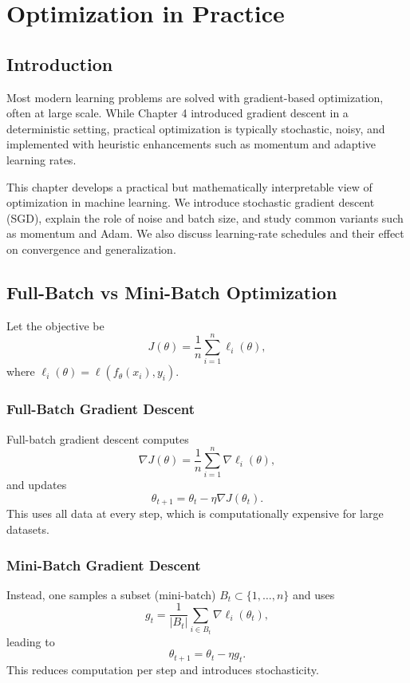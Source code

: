 \chapter{Optimization in Practice}

\section{Introduction}

Most modern learning problems are solved with gradient-based optimization, often at large scale. While Chapter 4 introduced gradient descent in a deterministic setting, practical optimization is typically stochastic, noisy, and implemented with heuristic enhancements such as momentum and adaptive learning rates.

This chapter develops a practical but mathematically interpretable view of optimization in machine learning. We introduce stochastic gradient descent (SGD), explain the role of noise and batch size, and study common variants such as momentum and Adam. We also discuss learning-rate schedules and their effect on convergence and generalization.

\section{Full-Batch vs Mini-Batch Optimization}

Let the objective be
\[
J(\theta)=\frac1n\sum_{i=1}^n \ell_i(\theta),
\]
where $\ell_i(\theta)=\ell(f_\theta(x_i),y_i)$.

\subsection{Full-Batch Gradient Descent}

Full-batch gradient descent computes
\[
\nabla J(\theta)=\frac1n\sum_{i=1}^n \nabla \ell_i(\theta),
\]
and updates
\[
\theta_{t+1}=\theta_t-\eta \nabla J(\theta_t).
\]
This uses all data at every step, which is computationally expensive for large datasets.

\subsection{Mini-Batch Gradient Descent}

Instead, one samples a subset (mini-batch) $B_t\subset\{1,\dots,n\}$ and uses
\[
g_t=\frac{1}{|B_t|}\sum_{i\in B_t} \nabla \ell_i(\theta_t),
\]
leading to
\[
\theta_{t+1}=\theta_t-\eta g_t.
\]
This reduces computation per step and introduces stochasticity.

